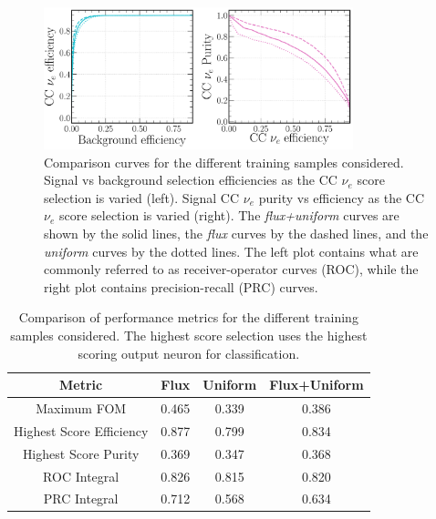 \begin{figure} %
    \includegraphics[width=0.8\textwidth]{diagrams/6-cvn/chipsnet/sample_nuel_comp_curves.pdf}
    \caption[Comparison curves for the different training samples considered.]
    {Comparison curves for the different training samples considered. Signal vs background
        selection efficiencies as the CC $\nu_{e}$ score selection is varied (left). Signal CC
        $\nu_{e}$ purity vs efficiency as the CC $\nu_{e}$ score selection is varied (right). The
        \emph{flux+uniform} curves are shown by the solid lines, the \emph{flux} curves by the
        dashed lines, and the \emph{uniform} curves by the dotted lines. The left plot contains
        what are commonly referred to as receiver-operator curves (ROC), while the right plot
        contains precision-recall (PRC) curves.}
    \label{fig:sample_nuel_comp_curves}
\end{figure}

\begin{table}
    \begin{tabular}{cccc}
        Metric                   & Flux  & Uniform & Flux+Uniform \\
        \midrule
        Maximum FOM              & 0.465 & 0.339   & 0.386        \\
        Highest Score Efficiency & 0.877 & 0.799   & 0.834        \\
        Highest Score Purity     & 0.369 & 0.347   & 0.368        \\
        ROC Integral             & 0.826 & 0.815   & 0.820        \\
        PRC Integral             & 0.712 & 0.568   & 0.634        \\
    \end{tabular}
    \caption[Comparison of performance metrics for the different training samples considered.]
    {Comparison of performance metrics for the different training samples considered. The highest
        score selection uses the highest scoring output neuron for classification.}
    \label{tab:sample}
\end{table}


